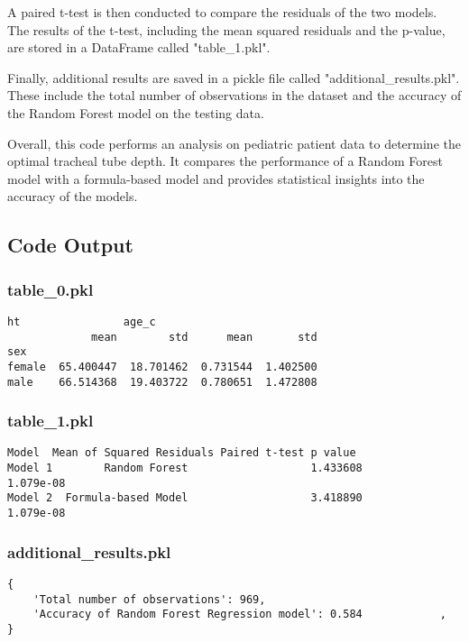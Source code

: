 \documentclass[11pt]{article}
\begin{document}
A paired t-test is then conducted to compare the residuals of the two models. The results of the t-test, including the mean squared residuals and the p-value, are stored in a DataFrame called "table\_1.pkl".

Finally, additional results are saved in a pickle file called "additional\_results.pkl". These include the total number of observations in the dataset and the accuracy of the Random Forest model on the testing data.

Overall, this code performs an analysis on pediatric patient data to determine the optimal tracheal tube depth. It compares the performance of a Random Forest model with a formula-based model and provides statistical insights into the accuracy of the models.

\subsection{Code Output}

\subsubsection*{table\_0.pkl}

\begin{Verbatim}[tabsize=4]
               ht                age_c
             mean        std      mean       std
sex
female  65.400447  18.701462  0.731544  1.402500
male    66.514368  19.403722  0.780651  1.472808
\end{Verbatim}

\subsubsection*{table\_1.pkl}

\begin{Verbatim}[tabsize=4]
                       Model  Mean of Squared Residuals Paired t-test p value
Model 1        Random Forest                   1.433608             1.079e-08
Model 2  Formula-based Model                   3.418890             1.079e-08
\end{Verbatim}

\subsubsection*{additional\_results.pkl}

\begin{Verbatim}[tabsize=4]
{
    'Total number of observations': 969,
    'Accuracy of Random Forest Regression model': 0.584            ,
}
\end{Verbatim}
\end{document}
